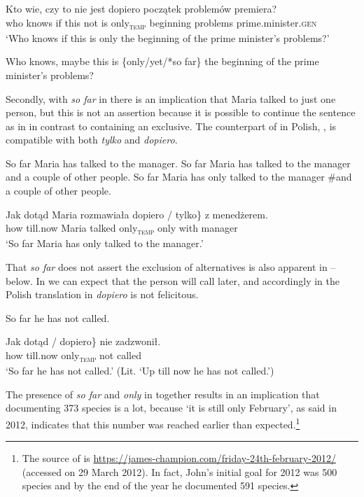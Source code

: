 \documentclass[output=paper,colorlinks,citecolor=brown]{langscibook}
\begin{document}
\ea\label{ex:tom:51}
\gll Kto wie, czy to nie jest dopiero początek problemów premiera?\\
who knows if this not is only\textsubscript{\textsc{temp}} beginning problems prime.minister.\textsc{gen}\\
\glt `Who knows if this is only the beginning of the prime minister’s problems?’
\z 

\ea\label{ex:tom:51b}
Who knows, maybe this is \{only/yet/*so far\} the beginning of the prime minister’s problems?
\z

\noindent Secondly, with \textit{so far} in  there is an implication that Maria talked to just one person, but this is not an assertion because it is possible to continue the sentence as in  in contrast to  containing an exclusive. The counterpart of  in Polish, , is compatible with both \textit{tylko} and \textit{dopiero}.

\ea\label{ex:tom:52}
\ea\label{ex:tom:52a}  
So far Maria has talked to the manager.
\ex\label{ex:tom:52b}        
So far Maria has talked to the manager and a couple of other people.
\ex\label{ex:tom:52c}       
So far Maria has only talked to the manager \#and a couple of other people.
\z 
\z 

\ea\label{ex:tom:53}
\gll Jak dotąd Maria rozmawiała \minsp{\{} dopiero / tylko\} z menedżerem.\\
how till.now Maria talked {} only\textsubscript{\textsc{temp}} {} only with manager\\
\glt `So far Maria has only talked to the manager.’ 
\z 

\noindent That \textit{so far} does not assert the exclusion of alternatives is also apparent in -- below. In  we can expect that the person will call later, and accordingly in the Polish translation in  \textit{dopiero} is not felicitous.

\ea\label{ex:tom:54}
So far he has not called.
\z 

\ea\label{ex:tom:55}
\gll \minsp{\{} Jak dotąd / \minsp{*} dopiero\} nie zadzwonił.\\
{} how till.now {} {} only\textsubscript{\textsc{temp}} not called\\
\glt ‘So far he has not called.' (Lit. ‘Up till now he has not called.’)
\z

\noindent The presence of \textit{so far} and \textit{only} in  together results in an implication that documenting 373 species is a lot, because ‘it is still only February’, as said in 2012, indicates that this number was reached earlier than expected.\footnote{The source of  is \url{https://james-champion.com/friday-24th-february-2012/} (accessed on 29 March 2012). In fact, John’s initial goal for 2012 was 500 species and by the end of the year he documented 591 species.}
\end{document}
